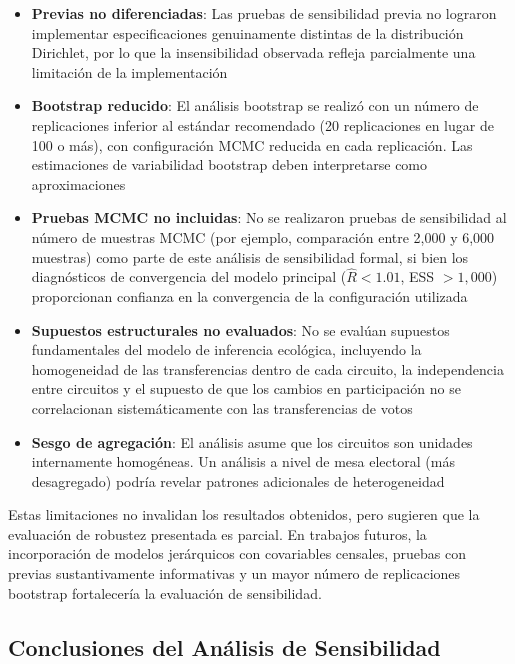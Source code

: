 \begin{itemize}
    \item \textbf{Previas no diferenciadas}: Las pruebas de sensibilidad previa no lograron implementar especificaciones genuinamente distintas de la distribución Dirichlet, por lo que la insensibilidad observada refleja parcialmente una limitación de la implementación

    \item \textbf{Bootstrap reducido}: El análisis bootstrap se realizó con un número de replicaciones inferior al estándar recomendado (20 replicaciones en lugar de 100 o más), con configuración MCMC reducida en cada replicación. Las estimaciones de variabilidad bootstrap deben interpretarse como aproximaciones

    \item \textbf{Pruebas MCMC no incluidas}: No se realizaron pruebas de sensibilidad al número de muestras MCMC (por ejemplo, comparación entre 2,000 y 6,000 muestras) como parte de este análisis de sensibilidad formal, si bien los diagnósticos de convergencia del modelo principal ($\hat{R} < 1.01$, ESS $> 1{,}000$) proporcionan confianza en la convergencia de la configuración utilizada

    \item \textbf{Supuestos estructurales no evaluados}: No se evalúan supuestos fundamentales del modelo de inferencia ecológica, incluyendo la homogeneidad de las transferencias dentro de cada circuito, la independencia entre circuitos y el supuesto de que los cambios en participación no se correlacionan sistemáticamente con las transferencias de votos

    \item \textbf{Sesgo de agregación}: El análisis asume que los circuitos son unidades internamente homogéneas. Un análisis a nivel de mesa electoral (más desagregado) podría revelar patrones adicionales de heterogeneidad
\end{itemize}

Estas limitaciones no invalidan los resultados obtenidos, pero sugieren que la evaluación de robustez presentada es parcial. En trabajos futuros, la incorporación de modelos jerárquicos con covariables censales, pruebas con previas sustantivamente informativas y un mayor número de replicaciones bootstrap fortalecería la evaluación de sensibilidad.

\subsection{Conclusiones del Análisis de Sensibilidad}
\label{sec:sensibilidad_conclusiones}

